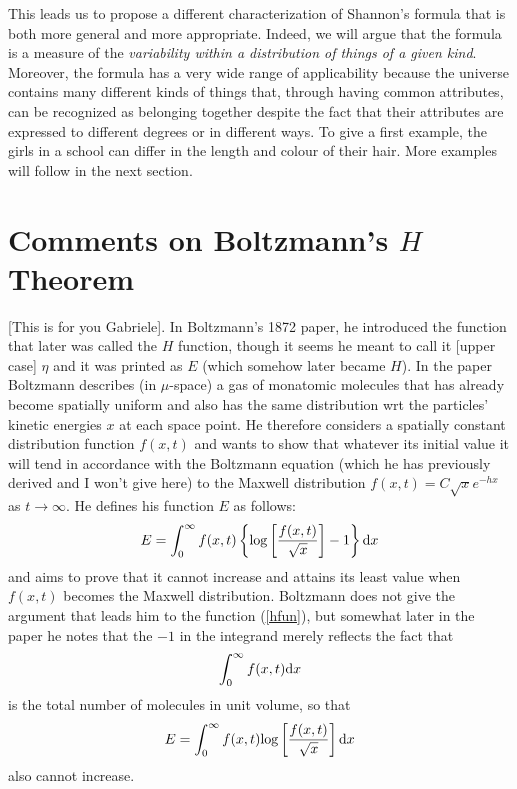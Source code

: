 \documentclass{article}
\begin{document}
This leads us to propose a different characterization of Shannon's formula that is both more general and more appropriate. Indeed, we will argue that the formula is a measure of the \emph{variability within a distribution of things of a given kind}. Moreover, the formula has a very wide range of applicability because the universe contains many different kinds of things that, through having common attributes, can be recognized as belonging together despite the fact that their attributes are expressed to different degrees or in different ways. To give a first example, the girls in a school can differ in the length and colour of their hair. More examples will follow in the next section.

\section{Comments on Boltzmann's $H$ Theorem}

[This is for you Gabriele]. In Boltzmann's 1872 paper, he introduced the function that later was called the $H$ function, though it seems he meant to call it [upper case] $\eta$ and it was printed as $E$ (which somehow later became $H$). In the paper Boltzmann describes (in $\mu$-space) a gas of monatomic molecules that has already become spatially uniform and also has the same distribution wrt the particles' kinetic energies $x$ at each space point. He therefore considers a spatially constant distribution function $f(x,t)$ and wants to show that whatever its initial value it will tend in accordance with the Boltzmann equation (which he has previously derived and I won't give here) to the Maxwell distribution $f(x,t)=C\sqrt xe^{-hx}$ as $t\rightarrow\infty$. He defines his function $E$ as follows:
\begin{equation}
E=\int_0^\infty f(x,t)\left\{\textrm{log}\left [{f(x,t)\over \sqrt x}\right ]-1\right\}\textrm dx\label{hfun}
\end{equation}
and aims to prove that it cannot increase and attains its least value when $f(x,t)$ becomes the Maxwell distribution. Boltzmann does not give the argument that leads him to the function (\ref{hfun}), but somewhat later in the paper he notes that the $-1$ in the integrand merely reflects the fact that
$$
\int_0^\infty f(x,t)\textrm dx
$$
is the total number of molecules in unit volume, so that 
\begin{equation}
E=\int_0^\infty f(x,t)\textrm{log}\left [{f(x,t)\over \sqrt x}\right ]\textrm dx\label{hfunb}
\end{equation}
also cannot increase.
\end{document}
